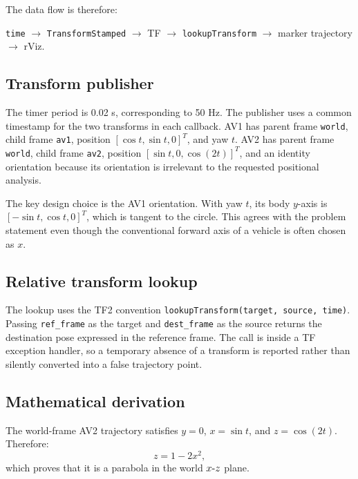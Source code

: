 \documentclass[letterpaper, 10 pt, conference]{ieeeconf}
\begin{document}
The data flow is therefore:
\begin{center}
\texttt{time} $\rightarrow$ \texttt{TransformStamped} $\rightarrow$ TF $\rightarrow$ \texttt{lookupTransform} $\rightarrow$ marker trajectory $\rightarrow$ rViz.
\end{center}

\subsection{Transform publisher}
The timer period is 0.02 s, corresponding to 50 Hz. The publisher uses a common timestamp for the two transforms in each callback. AV1 has parent frame \texttt{world}, child frame \texttt{av1}, position \([\cos t,\sin t,0]^T\), and yaw \(t\). AV2 has parent frame \texttt{world}, child frame \texttt{av2}, position \([\sin t,0,\cos(2t)]^T\), and an identity orientation because its orientation is irrelevant to the requested positional analysis.

The key design choice is the AV1 orientation. With yaw \(t\), its body \(y\)-axis is \([-\sin t,\cos t,0]^T\), which is tangent to the circle. This agrees with the problem statement even though the conventional forward axis of a vehicle is often chosen as \(x\).

\subsection{Relative transform lookup}
The lookup uses the TF2 convention \texttt{lookupTransform(target, source, time)}. Passing \texttt{ref\_frame} as the target and \texttt{dest\_frame} as the source returns the destination pose expressed in the reference frame. The call is inside a TF exception handler, so a temporary absence of a transform is reported rather than silently converted into a false trajectory point.

\subsection{Mathematical derivation}
The world-frame AV2 trajectory satisfies \(y=0\), \(x=\sin t\), and \(z=\cos(2t)\). Therefore:
\begin{equation}
z=1-2x^2,
\label{eq:worldparabola}
\end{equation}
which proves that it is a parabola in the world \(x$-$z\) plane.
\end{document}
